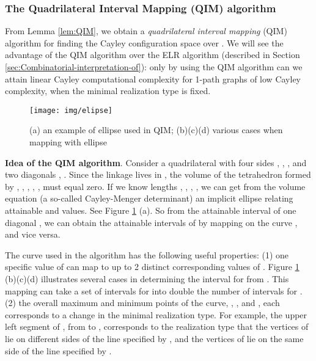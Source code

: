 \documentclass[secthm,amsthm,english]{article}
\theoremstyle{definition}
\theoremstyle{remark}
\begin{document}
\subsubsection{The Quadrilateral Interval Mapping (QIM) algorithm} \label{sub:QIM}

From Lemma \ref{lem:QIM}, we obtain a \emph{quadrilateral interval mapping }(QIM) algorithm for finding the Cayley configuration space over .
We will see the advantage of the QIM algorithm over the ELR algorithm (described in Section \ref{sec:Combinatorial-interpretation-of}):  
only by using the QIM algorithm can we attain linear Cayley computational complexity for 1-path graphs of low Cayley complexity, 
when the minimal realization type is fixed.

\begin{figure}[h]
		
		
	 
	 
	 
	 
	     
	
	\begin{centering}
	{\tiny \texttt{[image: img/elipse]} }
	\par\end{centering}{\tiny \par}
	
	\caption{ (a) an example of ellipse  used in QIM; (b)(c)(d) various cases when mapping with ellipse }
	

\label{F:ellipse} 
\end{figure}

\noindent \textbf{Idea of the QIM algorithm}. 
Consider a quadrilateral with four sides , , ,  and two diagonals , . 
Since the linkage lives in , 
the volume of the tetrahedron formed by , , , , ,  must equal zero. 
If we know lengths , , , , 
we can get from the volume equation (a so-called Cayley-Menger determinant) 
an implicit ellipse  relating attainable  and  values. 
See Figure \ref{F:ellipse} (a). 
So from the attainable interval  of one diagonal , 
we can obtain the attainable intervals of  by mapping  on the curve , and vice versa. 

The curve  used in the algorithm has the following useful properties: 
(1) one specific value of  
can map to up to 2 distinct corresponding values of .
Figure \ref{F:ellipse} (b)(c)(d) illustrates several cases in determining
the interval for  from .
This mapping can take a set of intervals for  into double the number of intervals for . 
(2) the overall maximum and minimum points of the curve, , ,  and , each corresponds to a change in the minimal realization type. 
For example, the upper
left segment of , from  to ,
corresponds to the realization type that the vertices of  lie on different sides of the line specified by , 
and the vertices of  lie on the same side of the line specified by . 
\end{document}
